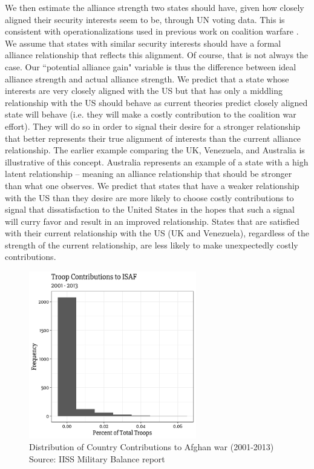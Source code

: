 \documentclass[12pt,letterpaper]{article}
\begin{document}
		We then estimate the alliance strength two states should have, given how closely aligned their security interests seem to be, through UN voting data. This is consistent with operationalizations used in previous work on coalition warfare \citep{wolford_politicsmilitarycoalitions_2015}. We assume that states with similar security interests should have a formal alliance relationship that reflects this alignment. Of course, that is not always the case. Our ``potential alliance gain" variable is thus the difference between ideal alliance strength and actual alliance strength. We predict that a state whose interests are very closely aligned with the US but that has only a middling relationship with the US should behave as current theories predict closely aligned state will behave (i.e. they will make a costly contribution to the coalition war effort). They will do so in order to signal their desire for a stronger relationship that better represents their true alignment of interests than the current alliance relationship. The earlier example comparing the UK, Venezuela, and Australia is illustrative of this concept. Australia represents an example of a state with a high latent relationship -- meaning an alliance relationship that should be stronger than what one observes. We predict that states that have a weaker relationship with the US than they desire are more likely to choose costly contributions to signal that dissatisfaction to the United States in the hopes that such a signal will curry favor and result in an improved relationship. States that are satisfied with their current relationship with the US (UK and Venezuela), regardless of the strength of the current relationship, are less likely to make unexpectedly costly contributions.

		\begin{figure}[ht]
			\centering
			\includegraphics[width=0.65\textwidth]{figures/troop_dist.pdf}
			\caption{Distribution of Country Contributions to Afghan war (2001-2013) Source: IISS Military Balance report}
			\label{fig:troop_hist}
		\end{figure}
		
\end{document}
